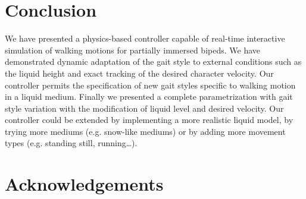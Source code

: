 \documentclass[conference]{acmsiggraph}
\begin{document}
\section{Conclusion}
\label{sec:conclusion}

We have presented a physics-based controller capable of real-time interactive simulation of walking motions for partially immersed bipeds. We have demonstrated dynamic adaptation of the gait style to external conditions such as the liquid height and exact tracking of the desired character velocity. Our controller permits the specification of new gait styles specific to walking motion in a liquid medium. Finally we presented a complete parametrization with gait style variation with the modification of liquid level and desired velocity.
Our controller could be extended by implementing a more realistic liquid model, by trying more mediums (e.g. snow-like mediums) or by adding more movement types (e.g. standing still, running…).


\section*{Acknowledgements}


\nocite{*}


\end{document}
